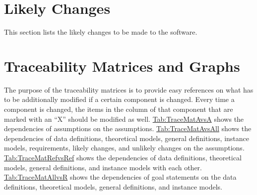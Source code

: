 \documentclass[12pt]{article}
\begin{document}
\section{Likely Changes}
\label{Sec:LCs}
This section lists the likely changes to be made to the software.

\section{Traceability Matrices and Graphs}
\label{Sec:TraceMatrices}
The purpose of the traceability matrices is to provide easy references on what has to be additionally modified if a certain component is changed. Every time a component is changed, the items in the column of that component that are marked with an ``X'' should be modified as well. \hyperref[Table:TraceMatAvsA]{Tab:TraceMatAvsA} shows the dependencies of assumptions on the assumptions. \hyperref[Table:TraceMatAvsAll]{Tab:TraceMatAvsAll} shows the dependencies of data definitions, theoretical models, general definitions, instance models, requirements, likely changes, and unlikely changes on the assumptions. \hyperref[Table:TraceMatRefvsRef]{Tab:TraceMatRefvsRef} shows the dependencies of data definitions, theoretical models, general definitions, and instance models with each other. \hyperref[Table:TraceMatAllvsR]{Tab:TraceMatAllvsR} shows the dependencies of goal statements on the data definitions, theoretical models, general definitions, and instance models.
\end{document}
